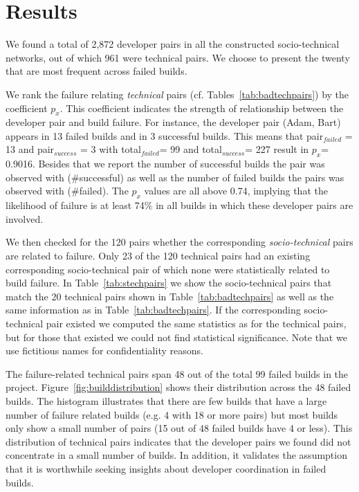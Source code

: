 \section{Results}
\label{ch:fse:result2}
We found a total of 2,872 developer pairs in all the constructed
socio-technical networks, out of which 961 were technical pairs. %
We choose to present the twenty that are most frequent across failed builds.

We rank the failure relating \emph{technical} pairs (cf. Tables~\ref{tab:badtechpairs})
by the coefficient $p_{x}$. This coefficient indicates the strength of
relationship between the developer pair and build failure. For instance, the
developer pair (Adam, Bart) appears in 13 failed builds and in 3
successful builds. This means that pair$_{failed}$ = 13 and pair$_{success}$ = 3
with total$_{failed}$= 99 and total$_{success}$= 227 result in $p_x$= 0.9016.
Besides that we report the number of successful builds the pair was observed with
(\#successful) as well as the number of failed builds the pairs was observed with
(\#failed). The $p_x$ values are all above 0.74, implying that the likelihood
of failure is at least 74\% in all builds in which these developer pairs are
involved. 

We then checked for the 120 pairs whether the corresponding \emph{socio-technical} pairs are related to failure.
Only 23 of the 120 technical pairs had an existing corresponding socio-technical pair of which none were statistically related to build failure. 
In Table~\ref{tab:stechpairs} we show the socio-technical pairs that match the 20 technical pairs shown in Table~\ref{tab:badtechpairs} as well as the same information as in Table~\ref{tab:badtechpairs}.
If the corresponding socio-technical pair existed we computed the same statistics as for the technical pairs, but for those that existed we could not find statistical significance.
Note that we use fictitious names for confidentiality reasons.

The failure-related technical pairs span 48 out of the total 99 failed builds in
the project. Figure~\ref{fig:builddistribution} shows their distribution
 across the 48 failed builds. The histogram
illustrates that there are few builds that have a large number of failure related
builds (e.g. 4 with 18 or more pairs) but most builds only show a small number of
pairs (15 out of 48 failed builds have 4 or less). 
This distribution of technical pairs indicates that the developer
pairs we found  did not concentrate in a small number of builds. 
In addition, it validates the assumption that it is
worthwhile seeking insights about developer coordination in failed builds.


